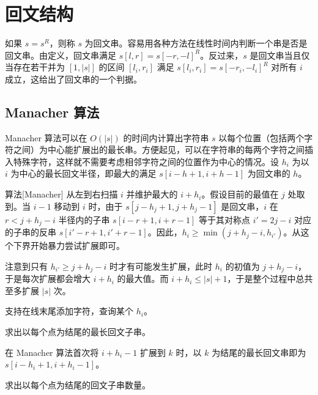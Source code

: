 \chapter{回文结构}

如果 $s=s^R$，则称 $s$ 为回文串。容易用各种方法在线性时间内判断一个串是否是回文串。由定义，回文串满足 $s[l,r]=s[-r,-l]^R$。反过来，$s$ 是回文串当且仅当存在若干并为 $[1,|s|]$ 的区间 $[l_i,r_i]$ 满足 $s[l_i,r_i]=s[-r_i,-l_i]^R$ 对所有 $i$ 成立，这给出了回文串的一个判据。

\section{Manacher 算法}

Manacher 算法可以在 $O(|s|)$ 的时间内计算出字符串 $s$ 以每个位置（包括两个字符之间）为中心能扩展出的最长串。方便起见，可以在字符串的每两个字符之间插入特殊字符，这样就不需要考虑相邻字符之间的位置作为中心的情况。设 $h_i$ 为以 $i$ 为中心的最长回文半径，即最大的满足 $s[i-h+1,i+h-1]$ 为回文串的 $h$。

\begin{descbox}{算法}[Manacher]
    从左到右扫描 $i$ 并维护最大的 $i+h_i$。假设目前的最值在 $j$ 处取到。当 $i-1$ 移动到 $i$ 时，由于 $s[j-h_j+1,j+h_j-1]$ 是回文串，$i$ 在 $r<j+h_j-i$ 半径内的子串 $s[i-r+1,i+r-1]$ 等于其对称点 $i'=2j-i$ 对应的子串的反串 $s[i'-r+1,i'+r-1]$。因此，$h_i\ge \min(j+h_j-i,h_{i'})$。从这个下界开始暴力尝试扩展即可。 

    注意到只有 $h_{i'}\ge j+h_j-i$ 时才有可能发生扩展，此时 $h_i$ 的初值为 $j+h_j-i$，于是每次扩展都会增大 $i+h_i$ 的最大值。而 $i+h_i\le |s|+1$，于是整个过程中总共至多扩展 $|s|$ 次。 
\end{descbox}
\begin{exercise}
    支持在线末尾添加字符，查询某个 $h_i$。
\end{exercise}

\begin{exercise}
    求出以每个点为结尾的最长回文子串。
\end{exercise}
\begin{solution}
    在 Manacher 算法首次将 $i+h_i-1$ 扩展到 $k$ 时，以 $k$ 为结尾的最长回文串即为 $s[i-h_i+1,i+h_i-1]$。 
\end{solution}

\begin{exercise}
    求出以每个点为结尾的回文子串数量。
\end{exercise}

